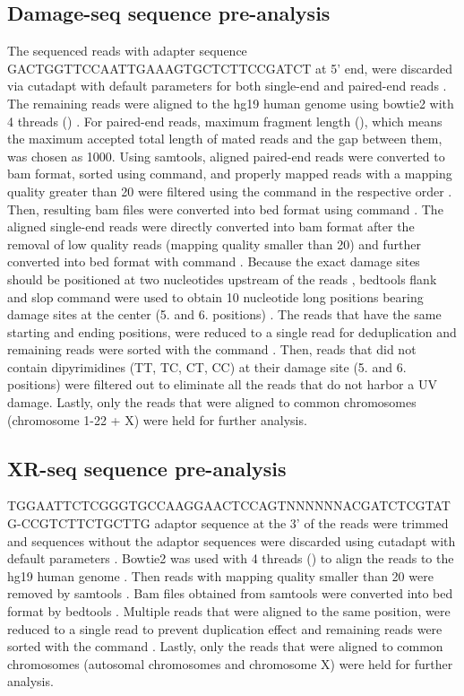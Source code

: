 \subsection{Damage-seq sequence pre-analysis}
The sequenced reads with adapter sequence GACTGGTTCCAATTGAAAGTGCTCTTCCGATCT at 5' end, were discarded via cutadapt with default parameters for both single-end and paired-end reads \citep{martin2011cutadapt}. The remaining reads were aligned to the hg19 human genome using bowtie2 with 4 threads () \citep{langmead2012fast}. For paired-end reads, maximum fragment length (), which means the maximum accepted total length of mated reads and the gap between them, was chosen as 1000. Using samtools, aligned paired-end reads were converted to bam format, sorted using  command, and properly mapped reads with a mapping quality greater than 20 were filtered using the command  in the respective order \citep{li2009sequence}. Then, resulting bam files were converted into bed format using  command \citep{quinlan2010bedtools}. The aligned single-end reads were directly converted into bam format after the removal of low quality reads (mapping quality smaller than 20) and further converted into bed format with  command \citep{quinlan2010bedtools}. Because the exact damage sites should be positioned at two nucleotides upstream of the reads \citep{li2009sequence}, bedtools flank and slop command were used to obtain 10 nucleotide long positions bearing damage sites at the center (5. and 6. positions) \citep{quinlan2010bedtools}. The reads that have the same starting and ending positions, were reduced to a single read for deduplication and remaining reads were sorted with the command . Then, reads that did not contain dipyrimidines (\gls{T}\gls{T}, \gls{T}\gls{C}, \gls{C}\gls{T}, \gls{C}\gls{C}) at their damage site (5. and 6. positions) were filtered out to eliminate all the reads that do not harbor a UV damage. Lastly, only the reads that were aligned to common chromosomes (chromosome 1-22 + X) were held for further analysis.

\subsection{XR-seq sequence pre-analysis}
TGGAATTCTCGGGTGCCAAGGAACTCCAGTNNNNNNACGATCTCGTATG-CCGTCTTCTGCTTG 
adaptor sequence at the 3' of the reads were trimmed and sequences without the adaptor sequences were discarded using cutadapt with default parameters \citep{martin2011cutadapt}. Bowtie2 was used with 4 threads () to align the reads to the hg19 human genome \citep{langmead2012fast}. Then reads with mapping quality smaller than 20 were removed by samtools \citep{li2009sequence}. Bam files obtained from samtools were converted into bed format by bedtools \citep{quinlan2010bedtools}. Multiple reads that were aligned to the same position, were reduced to a single read to prevent duplication effect and remaining reads were sorted with the command . Lastly, only the reads that were aligned to common chromosomes (autosomal chromosomes and chromosome X) were held for further analysis.


